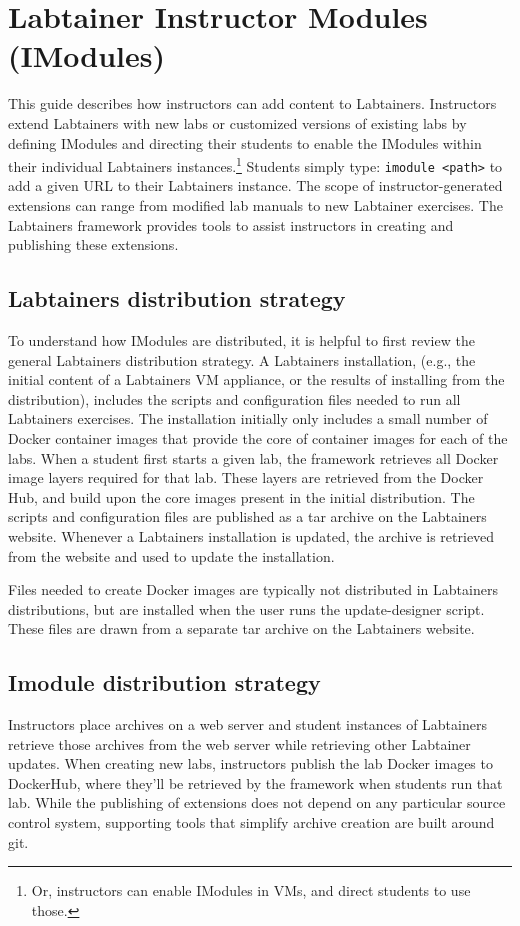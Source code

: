 \documentclass[12pt]{article}
\begin{document}
\section {Labtainer Instructor Modules (IModules)}
\label{imodules}
This guide describes how instructors can add content to Labtainers.
Instructors extend Labtainers with new labs or customized versions of existing
labs by defining IModules and directing their students to enable the IModules within
their individual Labtainers instances.\footnote{Or, instructors can enable IModules in VMs, and direct students to use those.}
Students simply type: {\tt imodule <path>} to add a given URL to their Labtainers instance.
The scope of instructor-generated extensions can range from modified lab manuals 
to new Labtainer exercises.  The Labtainers framework provides tools
to assist instructors in creating and publishing these extensions. 

\subsection{Labtainers distribution strategy}
To understand how IModules are distributed, it is helpful to first review the general
Labtainers distribution strategy.  A Labtainers installation, (e.g., the initial content of a Labtainers VM 
appliance, or the results of installing from the distribution),  includes the scripts and configuration files 
needed to run all Labtainers exercises.  The installation initially only includes a small number of 
Docker container images that provide the core of container images for each of the labs.   
When a student first starts a given lab, the framework retrieves all Docker image layers 
required for that lab.  These layers are retrieved from the Docker Hub, and build upon the core images
present in the initial distribution.   The scripts and configuration files are 
published as a tar archive on the Labtainers website.  Whenever a Labtainers installation is updated, 
the archive is retrieved from the website and used to update the installation.

Files needed to create Docker images are typically not distributed in Labtainers distributions, but are 
installed when the user runs the update-designer script.  These files are drawn from a separate 
tar archive on the Labtainers website.  

\subsection{Imodule distribution strategy}
Instructors place archives on a web server and student
instances of Labtainers retrieve those archives from the web server while retrieving other
Labtainer updates.  When creating new labs, instructors publish the lab Docker images to
DockerHub, where they'll be retrieved by the framework when students run that lab.
While the publishing of extensions does not depend on any particular 
source control system, supporting tools that simplify archive creation are built around git.  
\end{document}
